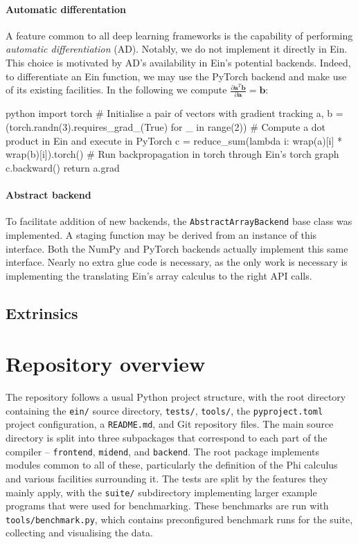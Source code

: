 \paragraph{Automatic differentation} A feature common to all deep learning frameworks is the capability of performing \textit{automatic differentiation} (AD). Notably, we do not implement it directly in Ein. This choice is motivated by AD's availability in Ein's potential backends. Indeed, to differentiate an Ein function, we may use the PyTorch backend and make use of its existing facilities. In the following we compute $\frac{\partial \mathbf{a}^T \mathbf{b}}{\partial \mathbf{a}} = \mathbf{b}$:
\begin{center}
\begin{cminted}{python}
import torch
# Initialise a pair of vectors with gradient tracking
a, b = (torch.randn(3).requires_grad_(True) for _ in range(2))
# Compute a dot product in Ein and execute in PyTorch
c = reduce_sum(lambda i: wrap(a)[i] * wrap(b)[i]).torch()
# Run backpropagation in torch through Ein's torch graph
c.backward()
return a.grad
\end{cminted}
\end{center}

\paragraph{Abstract backend} To facilitate addition of new backends, the \texttt{AbstractArrayBackend} base class was implemented. A staging function may be derived from an instance of this interface. Both the NumPy and PyTorch backends actually implement this same interface. Nearly no extra glue code is necessary, as the only work is necessary is implementing the translating Ein's array calculus to the right API calls.

\subsection{Extrinsics}

\todothis

\section{Repository overview}

The repository follows a usual Python project structure, with the root directory containing the \texttt{ein/} source directory, \texttt{tests/}, \texttt{tools/}, the \texttt{pyproject.toml} project configuration, a \texttt{README.md}, and Git repository files. The main source directory is split into three subpackages that correspond to each part of the compiler -- \texttt{frontend}, \texttt{midend}, and \texttt{backend}. The root package implements modules common to all of these, particularly the definition of the Phi calculus and various facilities surrounding it. The tests are split by the features they mainly apply, with the \texttt{suite/} subdirectory implementing larger example programs that were used for benchmarking. These benchmarks are run with \texttt{tools/benchmark.py}, which contains preconfigured benchmark runs for the suite, collecting and visualising the data.

